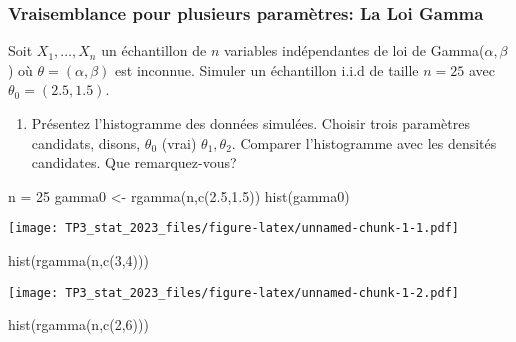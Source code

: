 \documentclass[
]{article}
\newenvironment{Shaded}{\begin{snugshade}}{\end{snugshade}}
\newcommand{\DecValTok}[1]{\textcolor[rgb]{0.00,0.00,0.81}{#1}}
\newcommand{\FloatTok}[1]{\textcolor[rgb]{0.00,0.00,0.81}{#1}}
\newcommand{\FunctionTok}[1]{\textcolor[rgb]{0.00,0.00,0.00}{#1}}
\newcommand{\NormalTok}[1]{#1}
\newcommand{\OtherTok}[1]{\textcolor[rgb]{0.56,0.35,0.01}{#1}}
\providecommand{\tightlist}{%
  \setlength{\itemsep}{0pt}\setlength{\parskip}{0pt}}
\begin{document}
\hypertarget{vraisemblance-pour-plusieurs-paramuxe8tres-la-loi-gamma}{%
\subsubsection{Vraisemblance pour plusieurs paramètres: La Loi
Gamma}\label{vraisemblance-pour-plusieurs-paramuxe8tres-la-loi-gamma}}

Soit \(X_1,\ldots,X_n\) un échantillon de \(n\) variables indépendantes
de loi de Gamma(\(\alpha, \beta\)) où \(\theta = (\alpha, \beta)\) est
inconnue. Simuler un échantillon i.i.d de taille \(n=25\) avec
\(\theta_0 = (2.5, 1.5)\).

\begin{enumerate}
\def\labelenumi{\arabic{enumi}.}
\setcounter{enumi}{6}
\tightlist
\item
  Présentez l'histogramme des données simulées. Choisir trois paramètres
  candidats, disons, \(\theta_0\) (vrai) \(\theta_1, \theta_2\).
  Comparer l'histogramme avec les densités candidates. Que
  remarquez-vous?
\end{enumerate}

\begin{Shaded}
\begin{Highlighting}[]
\NormalTok{n }\OtherTok{=} \DecValTok{25}
\NormalTok{gamma0 }\OtherTok{\textless{}{-}} \FunctionTok{rgamma}\NormalTok{(n,}\FunctionTok{c}\NormalTok{(}\FloatTok{2.5}\NormalTok{,}\FloatTok{1.5}\NormalTok{))}
\FunctionTok{hist}\NormalTok{(gamma0)}
\end{Highlighting}
\end{Shaded}

\texttt{[image: TP3\_stat\_2023\_files/figure-latex/unnamed-chunk-1-1.pdf]}

\begin{Shaded}
\begin{Highlighting}[]
\FunctionTok{hist}\NormalTok{(}\FunctionTok{rgamma}\NormalTok{(n,}\FunctionTok{c}\NormalTok{(}\DecValTok{3}\NormalTok{,}\DecValTok{4}\NormalTok{)))}
\end{Highlighting}
\end{Shaded}

\texttt{[image: TP3\_stat\_2023\_files/figure-latex/unnamed-chunk-1-2.pdf]}

\begin{Shaded}
\begin{Highlighting}[]
\FunctionTok{hist}\NormalTok{(}\FunctionTok{rgamma}\NormalTok{(n,}\FunctionTok{c}\NormalTok{(}\DecValTok{2}\NormalTok{,}\DecValTok{6}\NormalTok{)))}
\end{Highlighting}
\end{Shaded}
\end{document}
